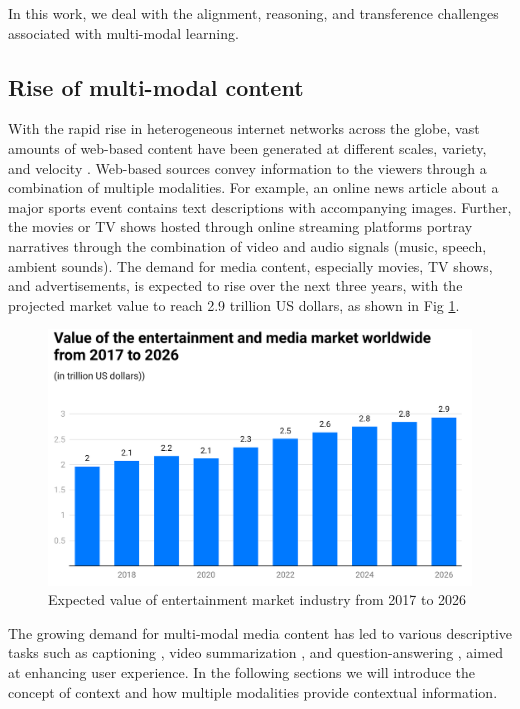 In this work, we deal with the alignment, reasoning, and transference challenges associated with multi-modal learning.
    
\subsection{Rise of multi-modal content}

With the rapid rise in heterogeneous internet networks across the globe, vast amounts of web-based content have been generated at different scales, variety, and velocity \cite{Gao2020ASO}. Web-based sources convey information to the viewers through a combination of multiple modalities. For example, an online news article about a major sports event contains text descriptions with accompanying images. Further, the movies or TV shows hosted through online streaming platforms portray narratives through the combination of video and audio signals (music, speech, ambient sounds). 
The demand for media content, especially movies, TV shows, and advertisements, is expected to rise over the next three years, with the projected market value to reach 2.9 trillion US dollars, as shown in Fig \ref{media industry demand}.
\begin{figure}[h!]
    \centering 
     \includegraphics[width=0.6\linewidth]{figures/media_industry_demand.png}
     \caption[Media value]{Expected value of entertainment market industry from 2017 to 2026 \footnotemark} 
     \label{media industry demand}
\end{figure}
The growing demand for multi-modal media content has led to various descriptive tasks such as captioning \cite{Abdar2023ARO}, video summarization \cite{Apostolidis2021VideoSU}, and question-answering \cite{defaria2023visual}, aimed at enhancing user experience. In the following sections we will introduce the concept of context and how multiple modalities provide contextual information.

